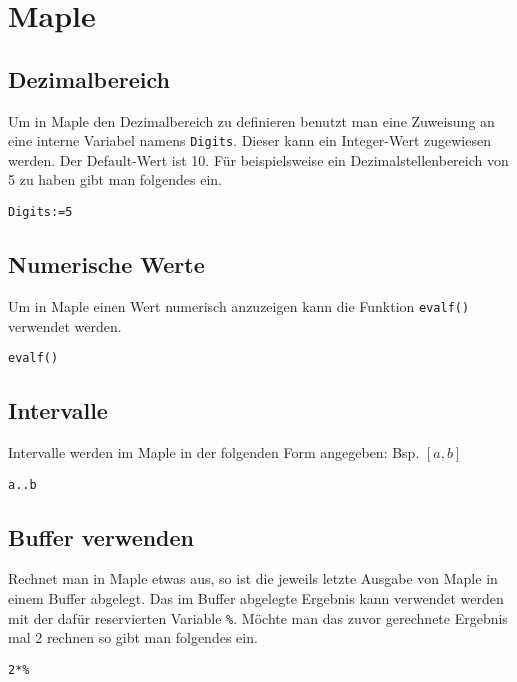 
\section{Maple}

\subsection{Dezimalbereich}
Um in Maple den Dezimalbereich zu definieren benutzt man eine Zuweisung
an eine interne Variabel namens \verb!Digits!. Dieser kann ein Integer-Wert
zugewiesen werden. Der Default-Wert ist 10. Für beispielsweise ein 
Dezimalstellenbereich von 5 zu haben gibt man folgendes ein.

\begin{lstlisting}[caption=Dezimalstellen, label=Dezimalstellen]
Digits:=5
\end{lstlisting}

\subsection{Numerische Werte}
Um in Maple einen Wert numerisch anzuzeigen kann die Funktion \verb!evalf()!
verwendet werden.

\begin{lstlisting}[caption=Numerisch, label=Numerisch]
evalf()
\end{lstlisting}

\subsection{Intervalle}
Intervalle werden im Maple in der folgenden Form angegeben: Bsp. $[a,b]$

\begin{lstlisting}[caption=Intervalle, label=Intervalle]
a..b
\end{lstlisting}

\subsection{Buffer verwenden}
Rechnet man in Maple etwas aus, so ist die jeweils letzte Ausgabe von
Maple in einem Buffer abgelegt. Das im Buffer abgelegte Ergebnis kann 
verwendet werden mit der dafür reservierten Variable \verb!%!. Möchte man
das zuvor gerechnete Ergebnis mal 2 rechnen so gibt man folgendes ein.

\begin{lstlisting}[caption=Buffer lesen, label=Buffer lesen]
2*%
\end{lstlisting}


